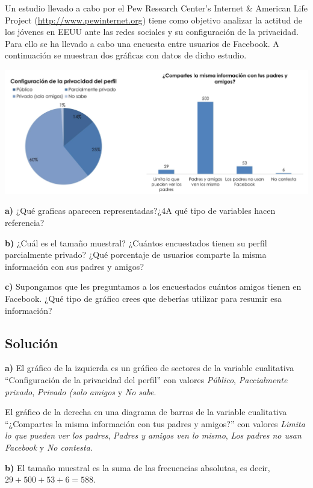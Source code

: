 \documentclass[
]{book}
\begin{document}
Un estudio llevado a cabo por el Pew Research Center's Internet \& American Life Project (\url{http://www.pewinternet.org}) tiene como objetivo analizar la actitud de los jóvenes en EEUU ante las redes sociales y su configuración de la privacidad. Para ello se ha llevado a cabo una encuesta entre usuarios de Facebook. A continuación se muestran dos gráficas con datos de dicho estudio.

\includegraphics[width=25.81in]{img/1_8}

\textbf{a)} ¿Qué graficas aparecen representadas?¿4A qué tipo de variables hacen referencia?

\textbf{b)} ¿Cuál es el tamaño muestral? ¿Cuántos encuestados tienen su perfil parcialmente privado? ¿Qué porcentaje de usuarios comparte la misma información con sus padres y amigos?

\textbf{c)} Supongamos que les preguntamos a los encuestados cuántos amigos tienen en Facebook. ¿Qué tipo de gráfico crees que deberías utilizar para resumir esa información?

\hypertarget{soluciuxf3n-5}{%
\subsection{Solución}\label{soluciuxf3n-5}}

\textbf{a)} El gráfico de la izquierda es un gráfico de sectores de la variable cualitativa ``Configuración de la privacidad del perfil'' con valores \emph{Público}, \emph{Paccialmente privado}, \emph{Privado (solo amigos} y \emph{No sabe}.

El gráfico de la derecha en una diagrama de barras de la variable cualitativa ``¿Compartes la misma información con tus padres y amigos?'' con valores \emph{Limita lo que pueden ver los padres}, \emph{Padres y amigos ven lo mismo}, \emph{Los padres no usan Facebook} y \emph{No contesta}.

\textbf{b)} El tamaño muestral es la suma de las frecuencias absolutas, es decir, \(29 + 500 + 53 + 6 = 588\).
\end{document}
